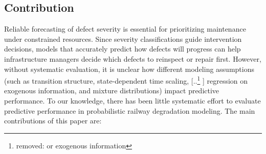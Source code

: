 \documentclass{article}
\providecommand{\DIFadd}[1]{{\protect\color{blue} \sf #1}} %
\providecommand{\DIFdel}[1]{{\protect\color{red} [..\footnote{removed: #1} ]}} %
\providecommand{\DIFaddbegin}{} %
\providecommand{\DIFaddend}{} %
\providecommand{\DIFdelbegin}{} %
\providecommand{\DIFdelend}{} %
\begin{document}
\subsection{Contribution}
Reliable forecasting of defect severity is essential for prioritizing maintenance under constrained resources. Since severity classifications guide intervention decisions, models that accurately predict how defects will progress can help infrastructure managers decide which defects to reinspect or repair first. However, without systematic evaluation, it is unclear how different modeling assumptions (such as transition structure, state-dependent time scaling, \DIFdelbegin \DIFdel{or exogenous information}\DIFdelend \DIFaddbegin \DIFadd{regression on exogenous information, and mixture distributions}\DIFaddend ) impact predictive performance. To our knowledge, there has been little systematic effort to evaluate predictive performance in probabilistic railway degradation modeling. 
The main contributions of this paper are:
\end{document}
